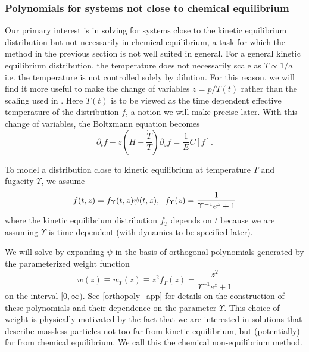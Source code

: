\subsubsection{Polynomials for systems   not close to chemical equilibrium}\label{kinetic_eq_approach}
Our primary interest is in solving  for systems close to the kinetic equilibrium distribution  but not necessarily in chemical equilibrium, a task for which the method in the previous section is not well suited in general. For a general kinetic equilibrium distribution, the temperature does not necessarily scale as $T\propto 1/a$ i.e. the temperature is not controlled solely by dilution.  For this reason, we will find it more useful to make the change of variables $z=p/T(t)$ rather than the scaling used in .  Here $T(t)$ is to be viewed as the time dependent effective temperature of the distribution $f$, a notion we will make precise later.  With this change of variables, the Boltzmann equation becomes
\begin{equation}\label{T_boltzmann}
\partial_t f-z\left(H+\frac{\dot T}{T}\right)\partial_z f=\frac{1}{E}C[f].
\end{equation}


 To model a distribution close to kinetic equilibrium at temperature $T$ and fugacity $\Upsilon$, we assume
\begin{equation}\label{kinetic_approx}
f(t,z)= f_\Upsilon (t,z)\psi(t,z),\hspace{2mm} f_\Upsilon(z)=\frac{1}{\Upsilon^{-1}e^z+1}
\end{equation}
where the kinetic equilibrium distribution $f_\Upsilon $ depends on $t$ because we are assuming $\Upsilon$ is time dependent (with dynamics to be specified later). 

We will solve  by expanding $\psi$ in the basis of orthogonal polynomials generated by the parameterized weight function
\begin{equation}\label{weight}
w(z)\equiv w_\Upsilon(z)\equiv z^2f_\Upsilon (z)=\frac{z^2}{\Upsilon^{-1} e^z+1}
\end{equation}
on the interval $[0,\infty)$. See \ref{orthopoly_app} for details on the construction of these polynomials and their dependence on the parameter $\Upsilon$. This choice of weight is physically motivated by the fact that we are interested in solutions that describe massless particles not too far from kinetic equilibrium, but (potentially) far from chemical equilibrium. We call this the chemical non-equilibrium method.

